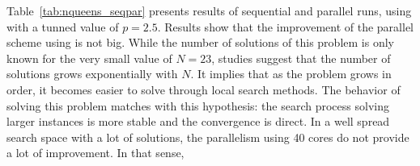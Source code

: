 Table~\ref{tab:nqueens_seqpar} presents results of sequential and parallel runs, using  with a tunned value of $p=2.5$. Results show that the improvement of the parallel scheme using \posl{} is not big. While the number of solutions of this problem is only known for the very small value of $N = 23$, studies suggest that the number of solutions grows exponentially with $N$. It implies that as the problem grows in order, it becomes easier to solve through local search methods. The behavior of \posl{} solving this problem matches  with this hypothesis: the search process solving larger instances is more stable and the convergence is direct. In a well spread search space with a lot of solutions, the parallelism using 40 cores do not provide a lot of improvement. In that sense, 

\begin{table}[t]
\centering 
\renewcommand{\arraystretch}{1}
\caption{Results for \NQP{} (sequential and parallel without communication)}\label{tab:nqueens_seqpar}
\end{table}

\separation

